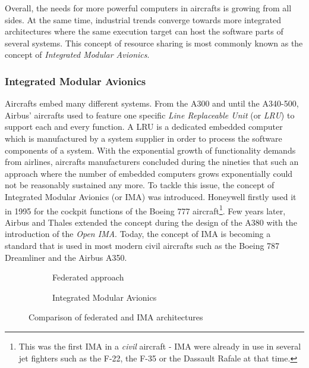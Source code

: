 \documentclass[main.tex]{subfiles}
\begin{document}
Overall, the needs for more powerful computers in aircrafts is growing from all sides. At the same time, industrial trends converge towards more integrated architectures where the same execution target can host the software parts of several systems. This concept of resource sharing is most commonly known as the concept of \emph{Integrated Modular Avionics}.




\subsubsection{Integrated Modular Avionics}
Aircrafts embed many different systems. From the A300 and until the A340-500, Airbus' aircrafts used to feature one specific \emph{Line Replaceable Unit} (or \emph{LRU}) to support each and every function. A LRU is a dedicated embedded computer which is manufactured by a system supplier in order to process the software components of a system. With the exponential growth of functionality demands from airlines, aircrafts manufacturers concluded during the nineties that such an approach where the number of embedded computers grows exponentially could not be reasonably sustained any more. To tackle this issue, the concept of Integrated Modular Avionics (or IMA) was introduced. Honeywell firstly used it in 1995  for the cockpit functions of the Boeing 777 aircraft\footnote{This was the first IMA in a \emph{civil} aircraft - IMA were already in use in several jet fighters such as the F-22, the F-35 or the Dassault Rafale at that time.}. Few years later, Airbus and Thales extended the concept during the design of the A380 with the introduction of the \emph{Open IMA}. Today, the concept of IMA is becoming a standard that is used in most modern civil aircrafts such as the Boeing 787 Dreamliner and the Airbus A350. 

\begin{figure}
    \centering

    \begin{subfigure}[b]{0.49\linewidth}
        \scalebox{0.9}{}
        \caption{Federated approach}
        \label{fig_intro_federatedApproach}
    \end{subfigure}
    \begin{subfigure}[b]{0.49\linewidth}
        \centering
        \scalebox{0.9}{}
        \caption{Integrated Modular Avionics}
        \label{fig_intro_IMA}
    \end{subfigure}
    \caption{Comparison of federated and IMA architectures}
    \label{fig_intro_comparisonFederatedVsIMA}
\end{figure}
\end{document}
